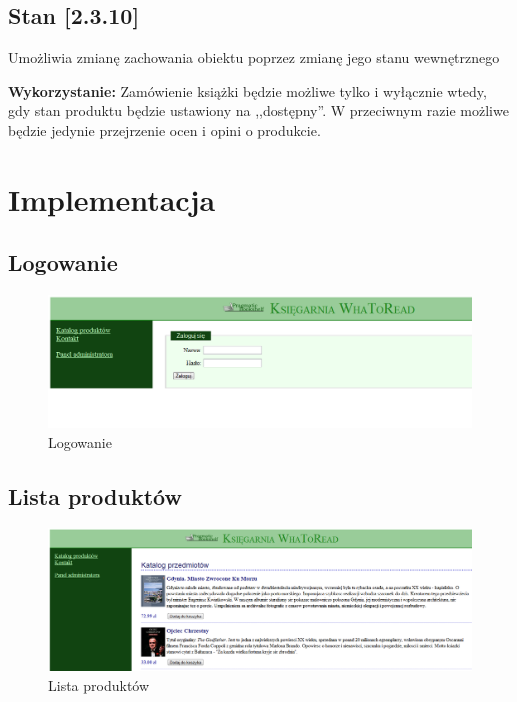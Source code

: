 \documentclass[pdflatex,11pt]{aghdpl}
\begin{document}
\section{Stan [2.3.10]}

Umożliwia zmianę zachowania obiektu poprzez zmianę jego stanu wewnętrznego

\textbf{Wykorzystanie:} Zamówienie książki będzie możliwe tylko i wyłącznie wtedy, gdy stan produktu będzie ustawiony na ,,dostępny''. W przeciwnym razie możliwe będzie jedynie przejrzenie ocen i opini o produkcie.


\chapter{Implementacja}

\section{Logowanie}

\begin{figure}[!h]
\centering
\includegraphics[width=\textwidth]{logowanie}
\caption{Logowanie}
\label{fig:logowanie}
\end{figure}



\section{Lista produktów}

\begin{figure}[!h]
\centering
\includegraphics[width=\textwidth]{lista_produktow}
\caption{Lista produktów}
\label{fig:lista_produktow}
\end{figure}
\end{document}
